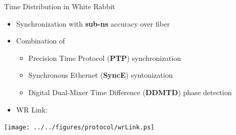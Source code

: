 \documentclass[compress,red]{beamer}
\begin{document}
% 
% 
% 

\begin{frame}{Time Distribution in White Rabbit}

  \begin{itemize}
    \item Synchronization with {\bf sub-ns} accuracy over fiber
    \item Combination of
	\begin{itemize}
	  \item Precision Time Protocol ({\bf PTP}) synchronization
	  \item Synchronous Ethernet ({\bf SyncE}) syntonization
	  \item Digital Dual-Mixer Time Difference ({\bf DDMTD}) phase detection
	\end{itemize}
    \item WR Link:
  \end{itemize}

  \begin{center}
  \texttt{[image: ../../figures/protocol/wrLink.ps]}
  \end{center}

\end{frame}
\end{document}
